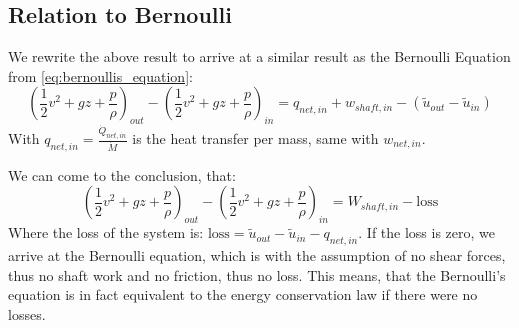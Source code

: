 \subsection{Relation to Bernoulli}
We rewrite the above result to arrive at a similar result as the Bernoulli Equation from \eqref{eq:bernoullis_equation}:
\begin{equation*}
	\left(\frac 12 v^2 + gz + \frac p\rho\right)_{out}- \left(\frac 12 v^2 + gz + \frac p\rho\right)_{in}= q_{net,in} + w_{shaft,in}-(\tilde u_{out}-\tilde u_{in})
\end{equation*}
With $ q_{net,in} = \frac{\dot Q_{net,in}}{\dot M}$ is the heat transfer per mass, same with $w_{net,in}$.

We can come to the conclusion, that:
\begin{equation*}
	\left(\frac 12 v^2+gz + \frac p\rho\right)_{out} - 
	\left(\frac 12 v^2+gz + \frac p\rho\right)_{in} =W_{shaft,in} - \mathrm{loss}
\end{equation*}
Where the loss of the system is: $\mathrm{loss}= \tilde u_{out}-\tilde u_{in} - q_{net,in}$. If the loss is zero, we arrive at the Bernoulli equation, which is with the assumption of no shear forces, thus no shaft work and no friction, thus no loss. This means, that the Bernoulli's equation is in fact equivalent to the energy conservation law if there were no losses.

\newpage
